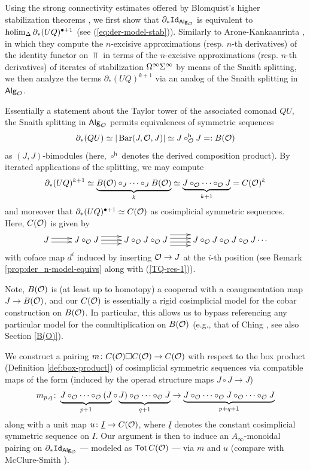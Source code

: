 Using the strong connectivity estimates offered by Blomquist's higher stabilization theorems \cite[]{Blom}, we first show that $\partial_* \mathtt{Id}_{{\mathsf{Alg}_{\mathcal{O}}}}$ is equivalent to $\operatorname{holim}_{\Delta} \partial_*(UQ)^{\bullet+1}$ (see (\ref{eq:der-model-stab})). Similarly to Arone-Kankaanrinta \cite{AK}, in which they compute the $n$-excisive approximations (resp. $n$-th derivatives) of the identity functor on $\Top$ in terms of the $n$-excisive approximations (resp. $n$-th derivatives) of iterates of stabilization $\Omega^{\infty} \Sigma^{\infty}$ by means of the Snaith splitting, we then analyze the terms $\partial_*(UQ)^{k+1}$ via an analog of the Snaith splitting in ${\mathsf{Alg}_{\mathcal{O}}}$.

Essentially a statement about the Taylor tower of the associated comonad $QU$, the Snaith splitting in ${\mathsf{Alg}_{\mathcal{O}}}$ permits equivalences of symmetric sequences\[\partial_*(QU)\simeq  |\operatorname{Bar}(J, \mathcal{O}, J)|\simeq J\circ^{\mathsf{h}}_{\mathcal{O}} J =:B(\mathcal{O})\] as $(J,J)$-bimodules (here, $\circ^{\mathsf{h}}$ denotes the derived composition product). By iterated applications of the splitting, we may compute \[\partial_*(UQ)^{k+1}\simeq \underbrace{B(\mathcal{O}) \circ_J \cdots \circ_J B(\mathcal{O})}_{k}\simeq \underbrace{J\circ_{\mathcal{O}}\cdots  \circ_{\mathcal{O}} J}_{k+1}= C(\mathcal{O})^k\] and moreover that $\partial_*(UQ)^{\bullet+1}\simeq C(\mathcal{O})$ as cosimplicial symmetric sequences. Here, $C(\mathcal{O})$ is given by \[\xymatrix{
    J \ar@<.5ex>[r] \ar@<-.5ex>[r] &
    J\circ_{\Cal{O}}J \ar@<-1ex>[r] \ar[r] \ar@<1ex>[r] &
    J\circ_{\Cal{O}}J \circ_{\Cal{O}}J \ar@<-1.5ex>[r] \ar@<-.5ex>[r] \ar@<.5ex>[r] \ar@<1.5 ex>[r] &
    J\circ_{\Cal{O}}J \circ_{\Cal{O}}J\circ_{\Cal{O}} J \cdots
}\]
with coface map $d^i$ induced by inserting $\mathcal{O}\to J$ at the $i$-th position (see Remark \ref{prop:der_n-model-equivs} along with (\ref{TQ-res-1})). 

Note, $B(\mathcal{O})$ is (at least up to homotopy) a cooperad with a coaugmentation map $J\to B(\mathcal{O})$, and our $C(\mathcal{O})$ is essentially a rigid cosimplicial model for the cobar construction on $B(\mathcal{O})$. In particular, this allows us to bypass referencing any particular model for the comultiplication on $B(\mathcal{O})$ (e.g.,  that of Ching \cite{Ching-thesis}, see also Section \ref{B(O)}).  

We construct a pairing $m\colon C(\mathcal{O})\square C(\mathcal{O})\to C(\mathcal{O})$ with respect to the box product (Definition \ref{def:box-product}) of cosimplicial symmetric sequences via compatible maps of the form (induced by the operad structure maps $J\circ J\to J$) \[ m_{p,q}\colon \underbrace{J\circ_{\mathcal{O}} \cdots \circ_{\mathcal{O}}(J}_{p+1}\circ \underbrace{J)\circ_{\mathcal{O}} \cdots \circ_{\mathcal{O}}J}_{q+1} \to \underbrace{J\circ_{\mathcal{O}}\cdots \circ_{\mathcal{O}} J\circ_{\mathcal{O}} \cdots \circ_{\mathcal{O}}J}_{p+q+1}\] along with a unit map $u\colon \underline{I}\to C(\mathcal{O})$, where $\underline{I}$ denotes the constant cosimplicial symmetric sequence on $I$. Our argument is then to induce an $A_{\infty}$-monoidal pairing on $\partial_* \mathtt{Id}_{{\mathsf{Alg}_{\mathcal{O}}}}$ --- modeled as $\operatorname{\mathsf{Tot}} C(\mathcal{O})$ --- via $m$ and $u$ (compare with McClure-Smith \cite{MS-box}).

